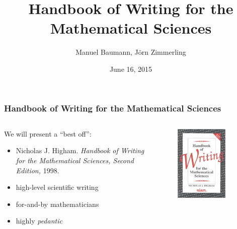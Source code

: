 \documentclass{beamer}
\title{\bf Handbook of Writing for the \\ Mathematical Sciences}
\author{Manuel Baumann, J\"orn Zimmerling}
\date{\footnotesize{June 16, 2015}}
\begin{document}
\frame{\titlepage}
\begin{frame}
\frametitle{Handbook of Writing for the Mathematical Sciences}
\begin{columns}
 \begin{column}{0.6\textwidth}
We will present a ``best off'':

 \begin{itemize}
  \item Nicholas J. Higham. \emph{Handbook of Writing for the Mathematical Sciences, Second Edition,} 1998.
  \item high-level scientific writing
  \item for-and-by mathematicians
  \item highly \textit{pedantic}
 \end{itemize}
 \end{column}

 \begin{column}{0.4\textwidth}
  \begin{figure}[t]
  \centering
  \includegraphics[width=0.8\textwidth]{images/book_cover.jpg}
  \end{figure}
 \end{column}
 \end{columns}
 
\end{frame}
\end{document}
